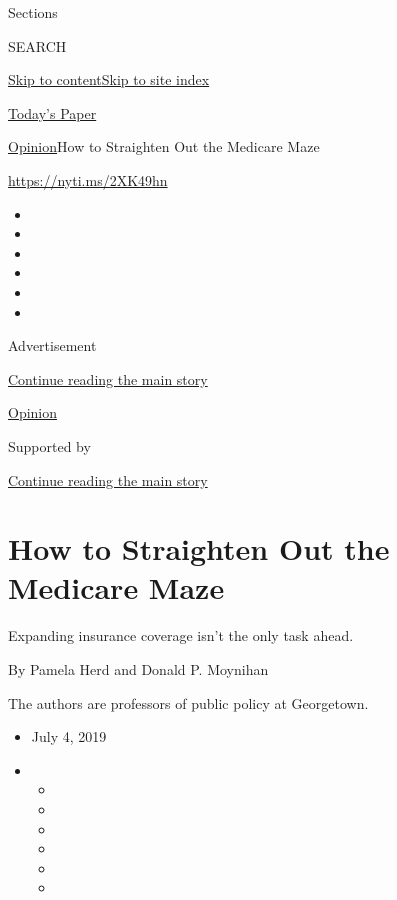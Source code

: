 Sections

SEARCH

\protect\hyperlink{site-content}{Skip to
content}\protect\hyperlink{site-index}{Skip to site index}

\href{https://myaccount.nytimes.com/auth/login?response_type=cookie\&client_id=vi}{}

\href{https://www.nytimes.com/section/todayspaper}{Today's Paper}

\href{/section/opinion}{Opinion}\textbar{}How to Straighten Out the
Medicare Maze

\href{https://nyti.ms/2XK49hn}{https://nyti.ms/2XK49hn}

\begin{itemize}
\item
\item
\item
\item
\item
\item
\end{itemize}

Advertisement

\protect\hyperlink{after-top}{Continue reading the main story}

\href{/section/opinion}{Opinion}

Supported by

\protect\hyperlink{after-sponsor}{Continue reading the main story}

\hypertarget{how-to-straighten-out-the-medicare-maze}{%
\section{How to Straighten Out the Medicare
Maze}\label{how-to-straighten-out-the-medicare-maze}}

Expanding insurance coverage isn't the only task ahead.

By Pamela Herd and Donald P. Moynihan

The authors are professors of public policy at Georgetown.

\begin{itemize}
\item
  July 4, 2019
\item
  \begin{itemize}
  \item
  \item
  \item
  \item
  \item
  \item
  \end{itemize}
\end{itemize}

